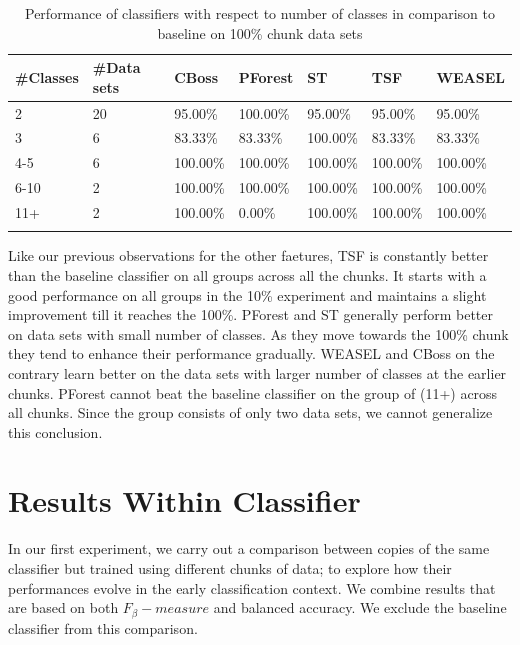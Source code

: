 \begin{table}[hbt!]
	\setlength\extrarowheight{2pt} %
	\begin{tabularx}{\textwidth}{|X|X|X|X|X|X|X|}
	\hline
	\textbf{\#Classes} & \textbf{\#Data sets} & \textbf{CBoss} & \textbf{PForest} & \textbf{ST} & \textbf{TSF} & \textbf{WEASEL} \\ \hline
		2 & 20 & 95.00\% & 100.00\% & 95.00\% & 95.00\% & 95.00\% \\ \hline
		3 & 6 & 83.33\% & 83.33\% & 100.00\% & 83.33\% & 83.33\% \\ \hline
		4-5 & 6 & 100.00\% & 100.00\% & 100.00\% & 100.00\% & 100.00\% \\ \hline
		6-10 & 2 & 100.00\% & 100.00\% & 100.00\% & 100.00\% & 100.00\% \\ \hline
		11+ & 2 & 100.00\% & 0.00\% & 100.00\% & 100.00\% & 100.00\% \\ \hline
  \caption{Performance of classifiers with respect to number of classes in comparison to baseline on 100\% chunk data sets}
  \label{TableNumClass100}
  \end{tabularx}
\end{table}

Like our previous observations for the other faetures, TSF is constantly better than the baseline classifier on all groups across all the chunks.
It starts with a good performance on all groups in the 10\% experiment and maintains a slight improvement till it reaches the 100\%.
PForest and ST generally perform better on data sets with small number of classes. As they move towards the 100\% chunk they tend to enhance their performance gradually.
WEASEL and CBoss on the contrary learn better on the data sets with larger number of classes at the earlier chunks.
PForest cannot beat the baseline classifier on the group of (11+) across all chunks. Since the group consists of only two data sets, we cannot generalize this conclusion.


\section{Results Within Classifier}
\label{SectionWithinComparison}
In our first experiment, we carry out a comparison between copies of the same classifier but trained using different chunks of data;
to explore how their performances evolve in the early classification context. We combine results that are based on both $F_{\beta}-measure$ and balanced accuracy.
We exclude the baseline classifier from this comparison.


